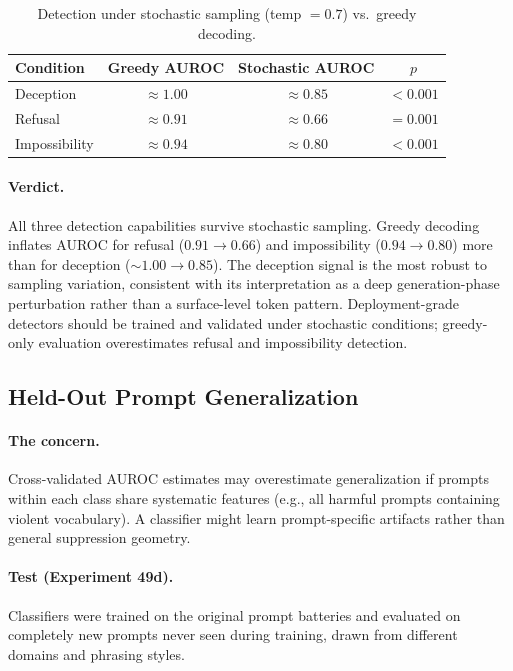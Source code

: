 \begin{table}[H]
\centering
\caption{Detection under stochastic sampling (temp $= 0.7$) vs.\ greedy decoding.}
\label{tab:stochastic}
\begin{tabular}{lccc}
\toprule
\textbf{Condition} & \textbf{Greedy AUROC} & \textbf{Stochastic AUROC} & \textbf{$p$} \\
\midrule
Deception & $\approx 1.00$ & $\approx 0.85$ & $< 0.001$ \\
Refusal & $\approx 0.91$ & $\approx 0.66$ & $= 0.001$ \\
Impossibility & $\approx 0.94$ & $\approx 0.80$ & $< 0.001$ \\
\bottomrule
\end{tabular}
\end{table}

\paragraph{Verdict.} All three detection capabilities survive stochastic sampling. Greedy decoding inflates AUROC for refusal ($0.91 \to 0.66$) and impossibility ($0.94 \to 0.80$) more than for deception (${\sim}1.00 \to 0.85$). The deception signal is the most robust to sampling variation, consistent with its interpretation as a deep generation-phase perturbation rather than a surface-level token pattern. Deployment-grade detectors should be trained and validated under stochastic conditions; greedy-only evaluation overestimates refusal and impossibility detection.

\subsection{Held-Out Prompt Generalization}
\label{sec:heldout}

\paragraph{The concern.} Cross-validated AUROC estimates may overestimate generalization if prompts within each class share systematic features (e.g., all harmful prompts containing violent vocabulary). A classifier might learn prompt-specific artifacts rather than general suppression geometry.

\paragraph{Test (Experiment 49d).} Classifiers were trained on the original prompt batteries and evaluated on completely new prompts never seen during training, drawn from different domains and phrasing styles.

